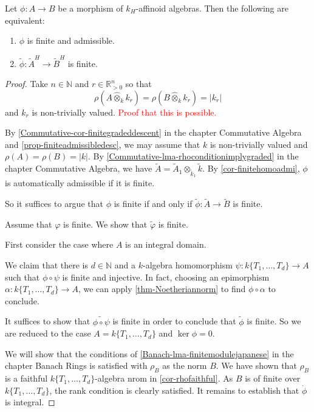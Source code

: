 \begin{thm}\label{thm-reductionfinite}
    Let $\phi:A\rightarrow B$ be a morphism of $k_H$-affinoid algebras. Then the following are equivalent:
    \begin{enumerate}
        \item $\phi$ is finite and admissible.
        \item $\tilde{\phi}:\tilde{A}^H\rightarrow \tilde{B}^H$ is finite.
    \end{enumerate}
\end{thm}
\begin{proof}
    Take $n\in \mathbb{N}$ and $r\in \mathbb{R}^n_{>0}$ so that 
    \[
        \rho(A\hat{\otimes}_k k_r)=\rho(B\hat{\otimes}_k k_r)=|k_r|
    \]
    and $k_r$ is non-trivially valued. \textcolor{red}{Proof that this is possible.}

    By \cref{Commutative-cor-finitegradeddescent} in the chapter Commutative Algebra and \cref{prop-finiteadmissibledesc},  we may assume that $k$ is non-trivially valued and $\rho(A)=\rho(B)=|k|$. By \cref{Commutative-lma-rhoconditionimplygraded} in  the chapter Commutative Algebra, we have $\tilde{A}=\tilde{A}_1\otimes_{\tilde{k}_1} \tilde{k}$. 
    By \cref{cor-finitehomoadmi}, $\phi$ is automatically admissible if it is finite. 
    
    So it suffices to argue that $\phi$ is finite if and only if $\tilde{\phi}:\tilde{A}\rightarrow \tilde{B}$ is finite. 
    
    Assume that $\varphi$ is finite. We show that $\tilde{\varphi}$ is finite. 

    First consider the case where $A$ is an integral domain. 
    
    We claim that there is $d\in \mathbb{N}$ and a $k$-algebra homomorphism $\psi:k\{T_1,\ldots,T_d\}\rightarrow A$ such that $\phi\circ \psi$ is finite and injective.  In fact, choosing an epimorphism $\alpha:k\{T_1,\ldots,T_d\}\rightarrow A$, we can apply \cref{thm-Noetheriannorm} to find $\phi\circ \alpha$ to conclude.

    It suffices to show that $\widetilde{\phi\circ\psi}$ is finite in order to conclude that $\tilde{\phi}$ is finite. So we are reduced to the case $A=k\{T_1,\ldots,T_d\}$ and $\ker \phi=0$.

    We will show that the conditions of \cref{Banach-lma-finitemodulejapanese} in the chapter Banach Rings is satisfied with $\rho_B$ as the norm $B$. We have shown that $\rho_B$ is a faithful $k\{T_1,\ldots,T_d\}$-algebra nrom in \cref{cor-rhofaithful}. As $B$ is of finite over $k\{T_1,\ldots,T_d\}$, the rank condition is clearly satisfied. It remains to establish that $\mathring{\phi}$ is integral.


\end{proof}

